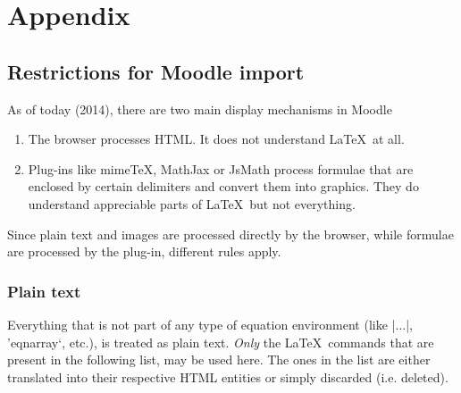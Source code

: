 \documentclass[a4paper,10pt]{ltxdoc}
\begin{document}






\section{Appendix}

\subsection{Restrictions for Moodle import}\label{secrestr}
As of today (2014), there are two main display mechanisms in Moodle
\begin{enumerate}
  \item The browser processes HTML. It does not understand \LaTeX\ at all.
  \item Plug-ins like mimeTeX, MathJax or JsMath process
    formulae that are enclosed by
  certain delimiters and convert them into graphics. They do understand
  appreciable parts of \LaTeX\, but not everything.
\end{enumerate}

Since plain text and images are processed directly by the browser, while
formulae are processed by the plug-in, different rules apply.

\subsubsection{Plain text}
Everything that is not part of any type of equation environment (like
|$\ldots$|, 'eqnarray`, etc.), is treated as plain text.
\emph{Only} the \LaTeX\ commands that are present in the following list, may
be used here. The ones in the list are either translated into their respective
HTML entities or simply discarded (i.e. deleted).
\end{document}
